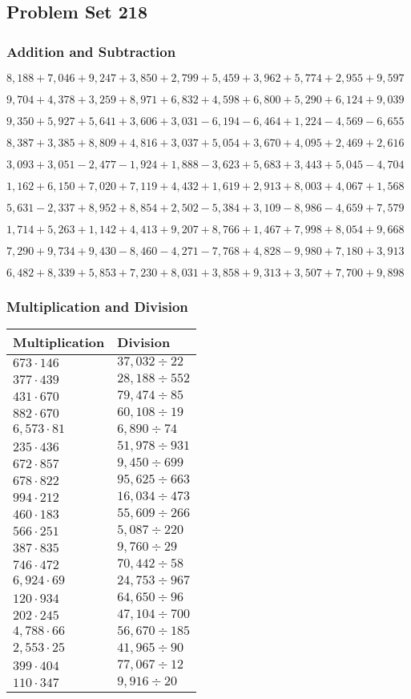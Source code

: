 \hypertarget{problem-set-218}{%
\subsection{Problem Set 218}\label{problem-set-218}}

\hypertarget{addition-and-subtraction}{%
\subsubsection{Addition and
Subtraction}\label{addition-and-subtraction}}

\(8,188+7,046+9,247+3,850+2,799+5,459+3,962+5,774+2,955+9,597\)

\(9,704+4,378+3,259+8,971+6,832+4,598+6,800+5,290+6,124+9,039\)

\(9,350+5,927+5,641+3,606+3,031-6,194-6,464+1,224-4,569-6,655\)

\(8,387+3,385+8,809+4,816+3,037+5,054+3,670+4,095+2,469+2,616\)

\(3,093+3,051-2,477-1,924+1,888-3,623+5,683+3,443+5,045-4,704\)

\(1,162+6,150+7,020+7,119+4,432+1,619+2,913+8,003+4,067+1,568\)

\(5,631-2,337+8,952+8,854+2,502-5,384+3,109-8,986-4,659+7,579\)

\(1,714+5,263+1,142+4,413+9,207+8,766+1,467+7,998+8,054+9,668\)

\(7,290+9,734+9,430-8,460-4,271-7,768+4,828-9,980+7,180+3,913\)

\(6,482+8,339+5,853+7,230+8,031+3,858+9,313+3,507+7,700+9,898\)

\hypertarget{multiplication-and-division}{%
\subsubsection{Multiplication and
Division}\label{multiplication-and-division}}

\begin{longtable}[]{@{}ll@{}}
\toprule
Multiplication & Division\tabularnewline
\midrule
\endhead
\(673\cdot146\) & \(37,032÷22\)\tabularnewline
\(377\cdot439\) & \(28,188÷552\)\tabularnewline
\(431\cdot670\) & \(79,474÷85\)\tabularnewline
\(882\cdot670\) & \(60,108÷19\)\tabularnewline
\(6,573\cdot81\) & \(6,890÷74\)\tabularnewline
\(235\cdot436\) & \(51,978÷931\)\tabularnewline
\(672\cdot857\) & \(9,450÷699\)\tabularnewline
\(678\cdot822\) & \(95,625÷663\)\tabularnewline
\(994\cdot212\) & \(16,034÷473\)\tabularnewline
\(460\cdot183\) & \(55,609÷266\)\tabularnewline
\(566\cdot251\) & \(5,087÷220\)\tabularnewline
\(387\cdot835\) & \(9,760÷29\)\tabularnewline
\(746\cdot472\) & \(70,442÷58\)\tabularnewline
\(6,924\cdot69\) & \(24,753÷967\)\tabularnewline
\(120\cdot934\) & \(64,650÷96\)\tabularnewline
\(202\cdot245\) & \(47,104÷700\)\tabularnewline
\(4,788\cdot66\) & \(56,670÷185\)\tabularnewline
\(2,553\cdot25\) & \(41,965÷90\)\tabularnewline
\(399\cdot404\) & \(77,067÷12\)\tabularnewline
\(110\cdot347\) & \(9,916÷20\)\tabularnewline
\bottomrule
\end{longtable}
